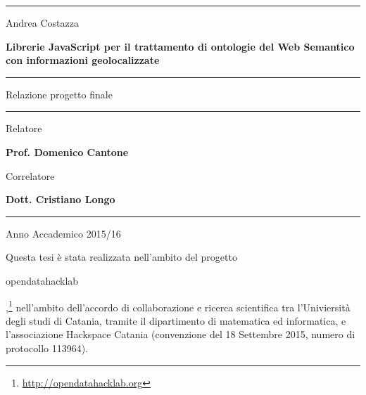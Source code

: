 \documentclass[a4paper,11pt]{article}
\begin{document}
\begin{center}
	\hrule
\end{center}

\vspace*{50pt}

\begin{center}
	\LARGE Andrea Costazza
\end{center}

\vspace*{30pt}

\begin{center}
	\LARGE \textbf{Librerie JavaScript per il trattamento di ontologie del Web Semantico con informazioni geolocalizzate}

\end{center}


\vspace*{80pt}

\noindent\hfil\rule{0.2\textwidth}{.4pt}\hfil

\begin{center}
	\Large Relazione progetto finale
\end{center}

\noindent\hfil\rule{0.2\textwidth}{.4pt}\hfil

\vspace*{180pt}

\begin{flushright}
	\Large Relatore

	\Large \textbf {Prof. Domenico Cantone}
\end{flushright}
\begin{flushright}
	\Large Correlatore

	\Large \textbf {Dott. Cristiano Longo}
\end{flushright}

\bigskip
\bigskip

\hrule

\begin{center}
	\Large Anno Accademico 2015/16
\end{center}
\thispagestyle{empty}
\newpage
\null
\thispagestyle{empty}

\newpage

\vspace*{80pt}
Questa tesi \`e stata realizzata nell'ambito del progetto
\begin{tt}opendatahacklab\end{tt},\footnote{\url{http://opendatahacklab.org}}
nell'ambito dell'accordo di collaborazione e ricerca scientifica tra l'Univiersit\`a degli
studi di Catania, tramite il dipartimento di matematica ed informatica, e 
l'associazione Hackspace Catania (convenzione del 18 Settembre 2015, numero di
protocollo 113964). 
\newpage
\end{document}
